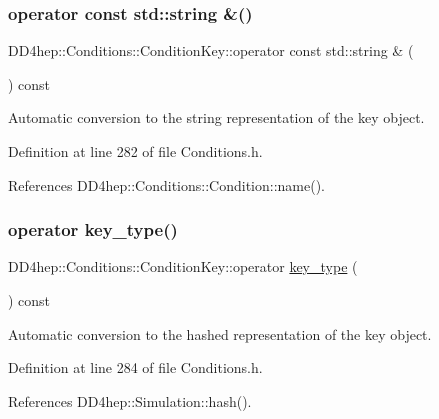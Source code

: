\subsubsection{\texorpdfstring{operator const std\+::string \&()}{operator const std::string \&()}}
{\footnotesize\ttfamily D\+D4hep\+::\+Conditions\+::\+Condition\+Key\+::operator const std\+::string \& (\begin{DoxyParamCaption}{ }\end{DoxyParamCaption}) const\hspace{0.3cm}{\ttfamily [inline]}}



Automatic conversion to the string representation of the key object. 



Definition at line 282 of file Conditions.\+h.



References D\+D4hep\+::\+Conditions\+::\+Condition\+::name().

\hypertarget{class_d_d4hep_1_1_conditions_1_1_condition_key_a665f221cfa44f24ff45df004c68b2080}{}\label{class_d_d4hep_1_1_conditions_1_1_condition_key_a665f221cfa44f24ff45df004c68b2080} 
\subsubsection{\texorpdfstring{operator key\+\_\+type()}{operator key\_type()}}
{\footnotesize\ttfamily D\+D4hep\+::\+Conditions\+::\+Condition\+Key\+::operator \hyperlink{class_d_d4hep_1_1_conditions_1_1_condition_key_a08bfc8ccb807bdd5e4d9f3b065d1c8f5}{key\+\_\+type} (\begin{DoxyParamCaption}{ }\end{DoxyParamCaption}) const\hspace{0.3cm}{\ttfamily [inline]}}



Automatic conversion to the hashed representation of the key object. 



Definition at line 284 of file Conditions.\+h.



References D\+D4hep\+::\+Simulation\+::hash().

